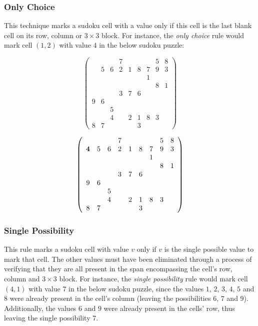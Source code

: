 \documentclass{article}
\begin{document}
\subsubsection{Only Choice}

This technique marks a sudoku cell with a value only if this cell is the last blank cell on its row, column or $3 \times 3$ block. For instance, the {\em only choice} rule would mark cell $(1,2)$ with value $4$ in the below sudoku puzzle:

\[ \left( \begin{array}{ccccccccc}
  &   &   & 7 &   &   &   & 5 & 8 \\
  & 5 & 6 & 2 & 1 & 8 & 7 & 9 & 3 \\
  &   &   &   &   &   & 1 &   &   \\
  &   &   &   &   &   &   & 8 & 1 \\
  &   &   & 3 & 7 & 6 &   &   &   \\
9 & 6 &   &   &   &   &   &   &   \\
  &   & 5 &   &   &   &   &   &   \\
  &   & 4 &   & 2 & 1 & 8 & 3 &   \\
8 & 7 &   &   &   & 3 &   &   &   \end{array}  \right)\]

\[ \left( \begin{array}{ccccccccc}
  &   &   & 7 &   &   &   & 5 & 8 \\
{\bf 4} & 5 & 6 & 2 & 1 & 8 & 7 & 9 & 3 \\
  &   &   &   &   &   & 1 &   &   \\
  &   &   &   &   &   &   & 8 & 1 \\
  &   &   & 3 & 7 & 6 &   &   &   \\
9 & 6 &   &   &   &   &   &   &   \\
  &   & 5 &   &   &   &   &   &   \\
  &   & 4 &   & 2 & 1 & 8 & 3 &   \\
8 & 7 &   &   &   & 3 &   &   &   \end{array}  \right)\]

\subsubsection{Single Possibility}

This rule marks a sudoku cell with value $v$ only if $v$ is the single possible value to mark that cell. The other values must have been eliminated through a process of verifying that they are all present in the span encompassing the cell's row, column and $3 \times 3$ block. For instance, the {\em single possibility} rule would mark cell $(4,1)$ with value $7$ in the below sudoku puzzle, since the values $1$, $2$, $3$, $4$, $5$ and $8$ were already present in the cell's column (leaving the possibilities $6$, $7$ and $9$). Additionally, the values $6$ and $9$ were already present in the cells' row, thus leaving the single possibility $7$.
\end{document}
